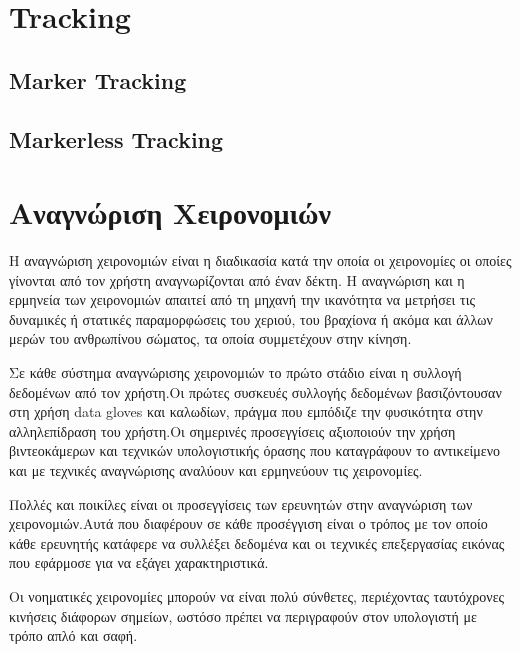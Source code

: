 \section{Tracking}
\subsection{Marker Tracking}
    
\subsection{Markerless Tracking}




\section{Αναγνώριση Χειρονομιών}



H αναγνώριση χειρονομιών είναι η διαδικασία κατά την οποία οι χειρονομίες οι οποίες γίνονται από τον χρήστη αναγνωρίζονται από έναν δέκτη. Η αναγνώριση και η ερμηνεία των χειρονομιών απαιτεί από τη μηχανή την ικανότητα να μετρήσει τις δυναμικές ή στατικές παραμορφώσεις του χεριού, του βραχίονα ή ακόμα και άλλων μερών του ανθρωπίνου σώματος, τα οποία συμμετέχουν στην κίνηση.

Σε κάθε σύστημα αναγνώρισης χειρονομιών το πρώτο στάδιο είναι η συλλογή δεδομένων από τον χρήστη.Οι πρώτες συσκευές συλλογής δεδομένων βασιζόντουσαν στη χρήση data gloves και καλωδίων, πράγμα που εμπόδιζε την φυσικότητα στην αλληλεπίδραση του χρήστη.Οι σημερινές προσεγγίσεις αξιοποιούν την χρήση βιντεοκάμερων και τεχνικών υπολογιστικής όρασης που καταγράφουν το αντικείμενο και με τεχνικές αναγνώρισης αναλύουν και ερμηνεύουν τις χειρονομίες.

Πολλές και ποικίλες είναι οι προσεγγίσεις των ερευνητών στην αναγνώριση των χειρονομιών.Αυτά που διαφέρουν σε κάθε προσέγγιση είναι ο τρόπος με τον οποίο κάθε ερευνητής κατάφερε να συλλέξει δεδομένα και οι τεχνικές επεξεργασίας εικόνας που εφάρμοσε για να εξάγει χαρακτηριστικά.

Οι νοηματικές χειρονομίες μπορούν να είναι πολύ σύνθετες, περιέχοντας ταυτόχρονες κινήσεις διάφορων σημείων, ωστόσο πρέπει να περιγραφούν στον υπολογιστή με τρόπο απλό και σαφή.

